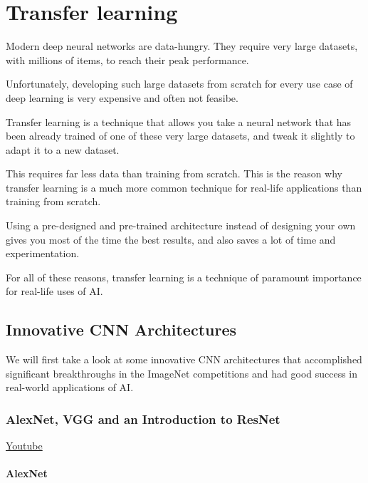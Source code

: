 \chapter{Transfer learning}
Modern deep neural networks are data-hungry. They require very large datasets, with millions of items, to reach their peak performance.\newline

Unfortunately, developing such large datasets from scratch for every use case of deep learning is very expensive and often not feasibe.\newline

Transfer learning is a technique that allows you take a neural network that has been already trained of one of these very large datasets, and tweak it slightly to adapt it to a new dataset.\newline

This requires far less data than training from scratch. This is the reason why transfer learning is a much more common technique for real-life applications than training from scratch.\newline

Using a pre-designed and pre-trained architecture instead of designing your own gives you most of the time the best results, and also saves a lot of time and experimentation.\newline

For all of these reasons, transfer learning is a technique of paramount importance for real-life uses of AI.

\section{Innovative CNN Architectures}

We will first take a look at some innovative CNN architectures that accomplished significant breakthroughs in the ImageNet competitions and had good success in real-world applications of AI.

\subsection{AlexNet, VGG and an Introduction to ResNet}
\href{https://www.youtube.com/watch?v=GdYOqihgb2k&ab_channel=Udacity}{Youtube}

\subsubsection{AlexNet}

